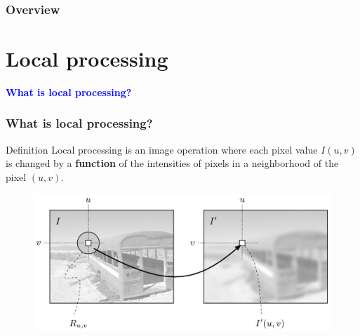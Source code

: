 \documentclass[english,11pt,table,handout]{beamer}
\date{09 September 2015}
\begin{document}
\begin{frame}
  \maketitle
\end{frame}

\begin{frame}\frametitle<presentation>{Overview}
  \tableofcontents
\end{frame}


\section{Local processing}
\frame
{
	\Huge
	\begin{center}
	\textcolor{blue}{\textbf{What is local processing?}}
	\end{center}
}

\frame
{
  \frametitle{What is local processing?}
	\begin{block}{Definition}
		Local processing is an image operation where each pixel value $I(u, v)$ is changed by a \textbf{function} of the intensities of pixels in a neighborhood of the pixel $(u, v)$.
	\end{block}
		
	\begin{figure}[!h]
   	\includegraphics[scale=0.5]{localproc.png}
	\end{figure}
}
\end{document}
